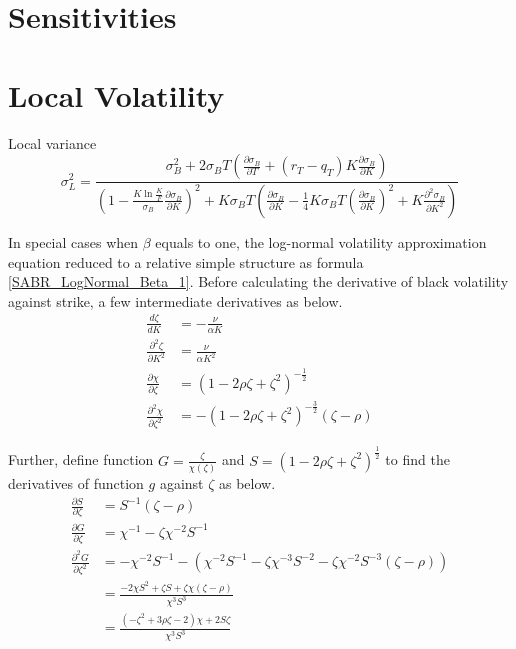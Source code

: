\documentclass{article}
\begin{document}
\section{Sensitivities}



\section{Local Volatility}

Local variance
\begin{equation}
    \sigma_{L}^2 = \frac{\sigma_{B}^2 + 2 \sigma_{B} T \left(\frac{\partial \sigma_{B}}{\partial T} + (r_T - q_T) K \frac{\partial \sigma_{B}}{\partial K}\right)}{\left(1 - \frac{K \ln{\frac{K}{F}}}{\sigma_{B}} \frac{\partial \sigma_{B}}{\partial K}\right)^2 + K \sigma_{B} T \left(\frac{\partial \sigma_{B}}{\partial K} - \frac{1}{4} K \sigma_{B} T \left(\frac{\partial \sigma_{B}}{\partial K}\right)^2 + K \frac{\partial^2 \sigma_{B}}{\partial K^2}\right)}
\end{equation}

In special cases when $ \beta $ equals to one, the log-normal volatility approximation equation reduced to a relative simple structure as formula \ref{SABR_LogNormal_Beta_1}.
Before calculating the derivative of black volatility against strike, a few intermediate derivatives as below.
\begin{subequations}
    \begin{align}
        \frac{d \zeta}{d K} &= -\frac{\nu}{\alpha K} \\
        \frac{\partial^2 \zeta}{\partial K^2} &= \frac{\nu}{\alpha K^2}\\
        \frac{\partial \chi}{\partial \zeta} &= \left(1 - 2 \rho \zeta + \zeta^2\right)^{-\frac{1}{2}}\\
        \frac{\partial^2 \chi}{\partial \zeta^2} &= -\left(1 - 2 \rho \zeta + \zeta^2\right)^{-\frac{3}{2}} \left(\zeta - \rho\right)
    \end{align}
\end{subequations}

Further, define function $ G = \frac{\zeta}{\chi\left(\zeta\right)} $ and $ S = \left(1 - 2 \rho \zeta + \zeta^2\right)^{\frac{1}{2}} $ to find the derivatives of function $ g $ against $ \zeta $ as below.
\begin{subequations}
    \begin{align}
        \frac{\partial S}{\partial \zeta} &= S^{-1} \left(\zeta - \rho\right) \\
        \frac{\partial G}{\partial \zeta} &= \chi^{-1} - \zeta \chi^{-2} S^{-1} \\
        \frac{\partial^2 G}{\partial \zeta^2} &= -\chi^{-2} S^{-1} - \left(\chi^{-2} S^{-1} - \zeta \chi^{-3} S^{-2} - \zeta \chi^{-2} S^{-3} \left(\zeta - \rho\right)\right) \nonumber \\
        &= \frac{-2 \chi S^2 + \zeta S + \zeta \chi \left(\zeta - \rho\right)}{\chi^3 S^3} \nonumber \\
        &= \frac{\left(-\zeta^2 + 3 \rho \zeta - 2\right) \chi + 2 S \zeta}{\chi^3 S^3}
    \end{align}
\end{subequations}
\end{document}
